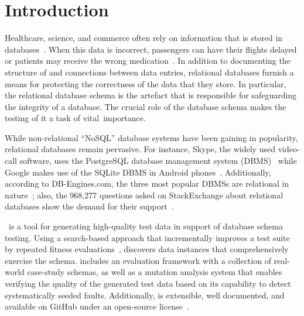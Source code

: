 \section{Introduction}\label{sec:intro}


Healthcare, science, and commerce often rely on information that is stored in
databases~\cite{kapfhammer2007comprehensive}.  When this data is incorrect, passengers can have their flights delayed or
patients may receive the wrong medication~\cite{databasebook}.  In addition to documenting the structure of and
connections between data entries, relational databases furnish a means for protecting the correctness of the data that
they store.  In particular, the relational database schema is the artefact that is responsible for safeguarding the
integrity of a database. The crucial role of the database schema makes the testing of it a task of \mbox{vital
importance}.


While non-relational ``NoSQL'' database systems have been gaining in popularity, relational databases remain pervasive.
For instance, Skype, the widely used video-call software, uses the PostgreSQL database management system
(DBMS)~\cite{postgres} while Google makes use of the SQLite DBMS in Android phones~\cite{sqlite}.  Additionally,
according to DB-Engines.com, the three most popular DBMSs are relational in nature~\cite{dbrank}; also, the 968,277
questions asked on StackExchange about relational databases show the demand for their support~\cite{stackexchange}.



\sa~is a tool for generating high-quality test data in support of database schema testing. Using a search-based approach
that incrementally improves a test suite by repeated fitness evaluations~\cite{Korel:AVM}, {\sa} discovers data
instances that comprehensively exercise the schema.  {\sa} includes an evaluation framework with a collection of
real-world case-study schemas, as well as a mutation analysis system that enables verifying the quality of the generated
test data based on its capability to detect systematically seeded faults.  Additionally, {\sa} is extensible, well
documented, and available on GitHub under an open-source license~\cite{tool}.

